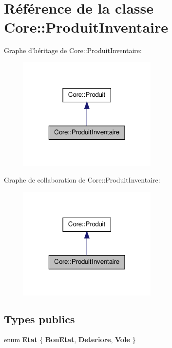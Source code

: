 \hypertarget{class_core_1_1_produit_inventaire}{
\section{Référence de la classe Core::ProduitInventaire}
\label{d4/d53/class_core_1_1_produit_inventaire}
}


Graphe d'héritage de Core::ProduitInventaire:\nopagebreak
\begin{figure}[H]
\begin{center}
\leavevmode
\includegraphics[width=196pt]{d8/d1c/class_core_1_1_produit_inventaire__inherit__graph}
\end{center}
\end{figure}


Graphe de collaboration de Core::ProduitInventaire:\nopagebreak
\begin{figure}[H]
\begin{center}
\leavevmode
\includegraphics[width=196pt]{da/dd7/class_core_1_1_produit_inventaire__coll__graph}
\end{center}
\end{figure}
\subsection*{Types publics}
\begin{DoxyCompactItemize}
\item 
enum {\bfseries Etat} \{ {\bfseries BonEtat}, 
{\bfseries Deteriore}, 
{\bfseries Vole}
 \}
\end{DoxyCompactItemize}
